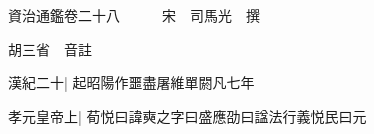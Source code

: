 






























































資治通鑑卷二十八　　　宋　司馬光　撰

胡三省　音註

漢紀二十|{
	起昭陽作噩盡屠維單閼凡七年}


孝元皇帝上|{
	荀悦曰諱奭之字曰盛應劭曰諡法行義悦民曰元}


